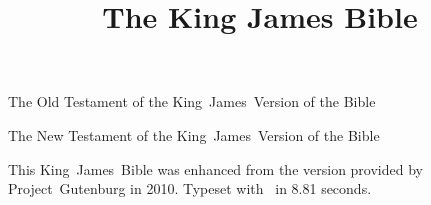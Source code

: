 \documentclass[twoside,twocolumn]{bible}
\title{The King James Bible}
\newcommand{\insertbook}[1]{}
\begin{document}
\null
\thispagestyle{empty}
\vfil
\centerline{\Large The Old Testament of the King~James~Version of the Bible}
\vfil
\null

\insertbook{old/genesis}
\insertbook{old/exodus}
\insertbook{old/leviticus}
\insertbook{old/numbers}
\insertbook{old/dueteronomy}
\insertbook{old/joshua}
\insertbook{old/judges}
\insertbook{old/ruth}
\insertbook{old/samuel1}
\insertbook{old/samuel2}
\insertbook{old/kings1}
\insertbook{old/kings2}
\insertbook{old/chronicles1}
\insertbook{old/chronicles2}
\insertbook{old/ezra}
\insertbook{old/nehemiah}
\insertbook{old/esther}
\insertbook{old/job}
\insertbook{old/psalms}
\insertbook{old/proverbs}
\insertbook{old/ecclesiastes}
\insertbook{old/songofsolomon}
\insertbook{old/isaiah}
\insertbook{old/jeremiah}
\insertbook{old/lamentations}
\insertbook{old/ezekiel}
\insertbook{old/daniel}
\insertbook{old/hosea}
\insertbook{old/joel}
\insertbook{old/amos}
\insertbook{old/obadiah}
\insertbook{old/jonah}
\insertbook{old/micah}
\insertbook{old/nahum}
\insertbook{old/habakkuk}
\insertbook{old/zechariah}
\insertbook{old/malachi}

\null
\thispagestyle{empty}
\vfil
\centerline{\Large The New Testament of the King~James~Version of the Bible}
\vfil
\null

\insertbook{new/matthew}
\insertbook{new/mark}
\insertbook{new/luke}
\insertbook{new/john}
\insertbook{new/acts}
\insertbook{new/romans}
\insertbook{new/corinthians1}
\insertbook{new/corinthians2}
\insertbook{new/glatations}
\insertbook{new/ephesians}
\insertbook{new/philippians}
\insertbook{new/colossians}
\insertbook{new/thessalonians1}
\insertbook{new/thessalonians2}
\insertbook{new/timothy1}
\insertbook{new/timothy2}
\insertbook{new/titus}
\insertbook{new/philemon}
\insertbook{new/hebrews}
\insertbook{new/james}
\insertbook{new/peter1}
\insertbook{new/peter2}
\insertbook{new/john1}
\insertbook{new/john2}
\insertbook{new/john3}
\insertbook{new/jude}
\insertbook{new/revelations}
\backmatter

This King~James~Bible was enhanced from the version provided by
Project~Gutenburg in 2010.  Typeset with \XeTeX\ in 8.81 seconds.
\end{document}
